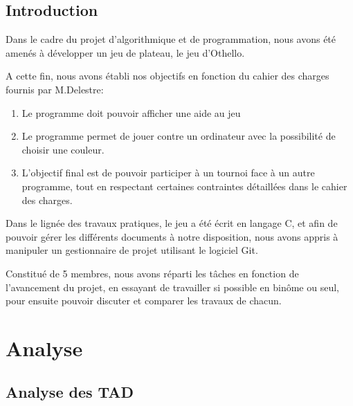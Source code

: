 \documentclass[11pt]{report}
\begin{document}
\thispagestyle{plain}
\chapter*{Introduction}
	Dans le cadre du projet d'algorithmique et de programmation, nous avons été amenés à développer un jeu de plateau, le jeu d'Othello.

	A cette fin, nous avons établi nos objectifs en fonction du cahier des charges fournis par M.Delestre:
\begin {enumerate}
\item Le programme doit pouvoir afficher une aide au jeu
\item Le programme permet de jouer contre un ordinateur avec la possibilité de choisir une couleur.
\item L'objectif final est de pouvoir participer à un tournoi face à un autre programme, tout en respectant certaines contraintes détaillées dans le cahier des charges.
\end {enumerate}

	Dans le lignée des travaux pratiques, le jeu a été écrit en langage C, et afin de pouvoir gérer les différents documents à notre disposition, nous avons appris à manipuler un gestionnaire de projet utilisant le logiciel Git.

	Constitué de 5 membres, nous avons réparti les tâches en fonction de l'avancement du projet, en essayant de travailler si possible en binôme ou seul, pour ensuite pouvoir discuter et comparer les travaux de chacun.	
\tableofcontents

\part{Analyse}
\chapter{Analyse des TAD}

\end{document}
